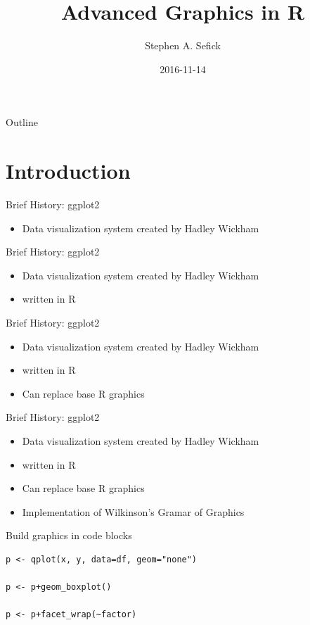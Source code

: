 \documentclass[t,10pt]{beamer}
\author{Stephen A. Sefick}
\date{2016-11-14}
\title{Advanced Graphics in R}
\begin{document}
\maketitle
\begin{frame}{Outline}
\tableofcontents
\end{frame}



\section{Introduction}
\label{sec:orgheadline9}

\begin{frame}[label={sec:orgheadline1}]{Brief History: ggplot2}
\begin{itemize}
\item Data visualization system created by Hadley Wickham
\end{itemize}
\end{frame}

\begin{frame}[label={sec:orgheadline2}]{Brief History: ggplot2}
\begin{itemize}
\item Data visualization system created by Hadley Wickham
\item written in R
\end{itemize}
\end{frame}

\begin{frame}[label={sec:orgheadline3}]{Brief History: ggplot2}
\begin{itemize}
\item Data visualization system created by Hadley Wickham
\item written in R
\item Can replace base R graphics
\end{itemize}
\end{frame}

\begin{frame}[fragile,label={sec:orgheadline4}]{Brief History: ggplot2}
 \begin{itemize}
\item Data visualization system created by Hadley Wickham
\item written in R
\item Can replace base R graphics
\item Implementation of Wilkinson's Gramar of Graphics
\end{itemize}

\begin{exampleblock}{Build graphics in code blocks}
\begin{verbatim}
p <- qplot(x, y, data=df, geom="none")

p <- p+geom_boxplot()

p <- p+facet_wrap(~factor)
\end{verbatim}
\end{exampleblock}
\end{frame}
\end{document}
